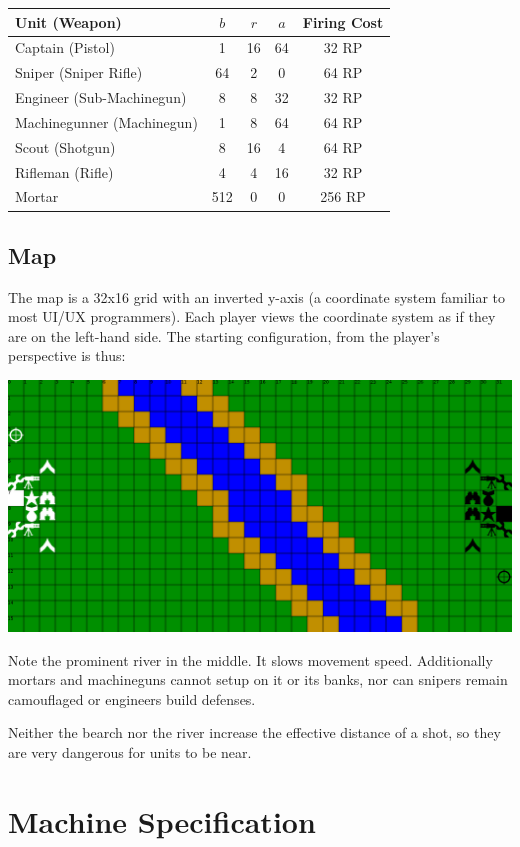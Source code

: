 \documentclass{article}
\begin{document}
\begin{tabular}{l | c | c | c | c}
    Unit (Weapon) & $b$ & $r$ & $a$ & Firing Cost \\ \hline
    Captain (Pistol) & 1 & 16 & 64 & 32 RP \\ \hline
    Sniper (Sniper Rifle) & 64 & 2 & 0 & 64 RP \\ \hline
    Engineer (Sub-Machinegun) & 8 & 8 & 32 & 32 RP \\ \hline
    Machinegunner (Machinegun) & 1 & 8 & 64 & 64 RP \\ \hline
    Scout (Shotgun) & 8 & 16 & 4 & 64 RP \\ \hline
    Rifleman (Rifle) & 4 & 4 & 16 & 32 RP \\ \hline
    Mortar & 512 & 0 & 0 & 256 RP \\ \hline
\end{tabular}

\subsection*{Map}

The map is a 32x16 grid with an inverted y-axis (a coordinate system familiar to
most UI/UX programmers). Each player views the coordinate system as if they are
on the left-hand side. The starting configuration, from the player's perspective
is thus:

\includegraphics[width=\textwidth]{res/map.png}

Note the prominent river in the middle. It slows movement speed. Additionally
mortars and machineguns cannot setup on it or its banks, nor can snipers remain
camouflaged or engineers build defenses.

Neither the bearch nor the river increase the effective distance of a shot, so
they are very dangerous for units to be near.

\section*{Machine Specification}
\end{document}

